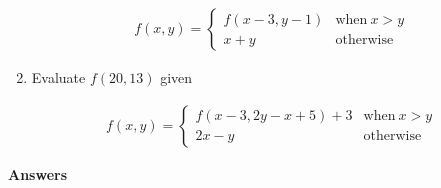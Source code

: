 \documentclass[12pt,letterpaper,fleqn]{article}
\begin{document}
\begin{enumerate}
  \begin{align*}
    f(x, y) =
    \begin{cases}
      f(x - 3, y - 1) & \text{when}\ x > y \\
      x + y & \text{otherwise}
    \end{cases}
  \end{align*}

\item Evaluate $f(20, 13)$ given

  \begin{align*}
    f(x, y) =
    \begin{cases}
      f(x - 3, 2y - x + 5) + 3 & \text{when}\ x > y \\
      2x - y & \text{otherwise}
    \end{cases}
  \end{align*}

\end{enumerate}

\pagebreak

\noindent \textbf{Answers}
\end{document}

